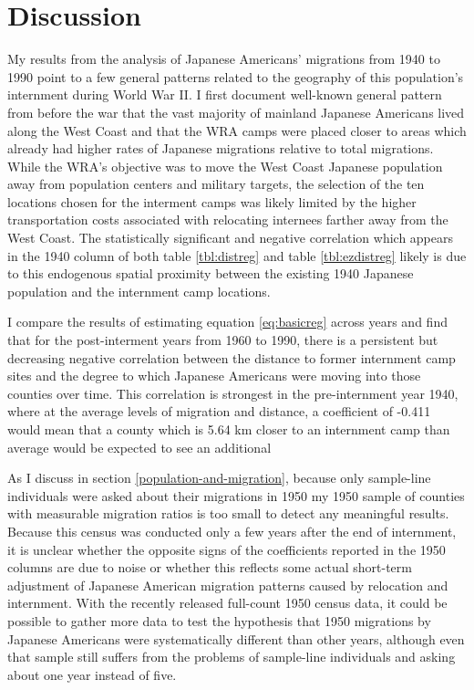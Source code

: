 \documentclass[12pt]{article}
\begin{document}
\section{Discussion}\label{discussion}

My results from the analysis of Japanese Americans' migrations from 1940 to 1990 
point to a few general patterns related to the geography of this population's internment during World War II.
I first document well-known general pattern from before the war 
that the vast majority of mainland Japanese Americans lived along the West Coast 
and that the WRA camps were placed closer to areas which already had higher rates of Japanese migrations relative to total migrations.
While the WRA's objective was to move the West Coast Japanese population away from population centers and military targets,
the selection of the ten locations chosen for the interment camps was likely limited by the higher transportation costs associated with relocating internees farther away from the West Coast.
The statistically significant and negative correlation which appears in the 1940 column of both table \ref{tbl:distreg} and table \ref{tbl:ezdistreg}
likely is due to this endogenous spatial proximity between the existing 1940 Japanese population and the internment camp locations.

I compare the results of estimating equation \ref{eq:basicreg} across years
and find that for the post-interment years from 1960 to 1990,
there is a persistent but decreasing negative correlation between the distance to 
former internment camp sites and the degree to which Japanese Americans were moving 
into those counties over time.
This correlation is strongest in the pre-internment year 1940, where at the average levels of migration and distance,
a coefficient of -0.411 would mean that a county which is 5.64 km closer to an internment camp than average would be expected to see an additional 

As I discuss in section \ref{population-and-migration}, 
because only sample-line individuals were asked about their migrations in 1950
my 1950 sample of counties with measurable migration ratios is too small 
to detect any meaningful results.
Because this census was conducted only a few years after the end of internment,
it is unclear whether the opposite signs of the coefficients reported in the 1950 columns 
are due to noise or whether this reflects some actual short-term adjustment of 
Japanese American migration patterns caused by relocation and internment.
With the recently released full-count 1950 census data, it could be possible to gather more data to test the hypothesis that 1950 migrations by Japanese Americans were systematically different than other years,
although even that sample still suffers from the problems of sample-line individuals and asking about one year instead of five.
\end{document}
